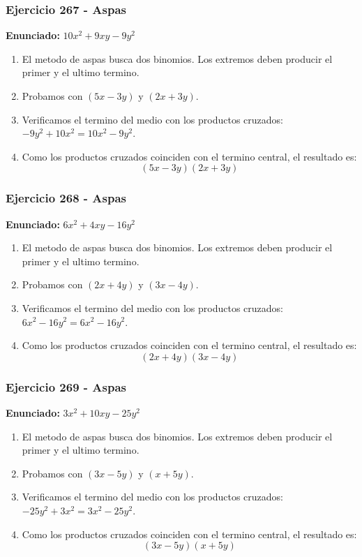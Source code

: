 \documentclass[11pt,a4paper]{article}
\begin{document}
\vspace{0.2cm}
\subsubsection*{Ejercicio 267 - Aspas}
\textbf{Enunciado:} $ 10 x^{2} + 9 x y - 9 y^{2} $\par
\begin{enumerate}[leftmargin=2em]
\item El metodo de aspas busca dos binomios. Los extremos deben producir el primer y el ultimo termino.
\item Probamos con \((5 x - 3 y)\) y \((2 x + 3 y)\).
\item Verificamos el termino del medio con los productos cruzados: \(- 9 y^{2}+10 x^{2}=10 x^{2} - 9 y^{2}\).
\item Como los productos cruzados coinciden con el termino central, el resultado es: \[\boxed{\left(5 x - 3 y\right)\left(2 x + 3 y\right)}\]
\end{enumerate}

\vspace{0.2cm}
\subsubsection*{Ejercicio 268 - Aspas}
\textbf{Enunciado:} $ 6 x^{2} + 4 x y - 16 y^{2} $\par
\begin{enumerate}[leftmargin=2em]
\item El metodo de aspas busca dos binomios. Los extremos deben producir el primer y el ultimo termino.
\item Probamos con \((2 x + 4 y)\) y \((3 x - 4 y)\).
\item Verificamos el termino del medio con los productos cruzados: \(6 x^{2}- 16 y^{2}=6 x^{2} - 16 y^{2}\).
\item Como los productos cruzados coinciden con el termino central, el resultado es: \[\boxed{\left(2 x + 4 y\right)\left(3 x - 4 y\right)}\]
\end{enumerate}

\vspace{0.2cm}
\subsubsection*{Ejercicio 269 - Aspas}
\textbf{Enunciado:} $ 3 x^{2} + 10 x y - 25 y^{2} $\par
\begin{enumerate}[leftmargin=2em]
\item El metodo de aspas busca dos binomios. Los extremos deben producir el primer y el ultimo termino.
\item Probamos con \((3 x - 5 y)\) y \((x + 5 y)\).
\item Verificamos el termino del medio con los productos cruzados: \(- 25 y^{2}+3 x^{2}=3 x^{2} - 25 y^{2}\).
\item Como los productos cruzados coinciden con el termino central, el resultado es: \[\boxed{\left(3 x - 5 y\right)\left(x + 5 y\right)}\]
\end{enumerate}
\end{document}
